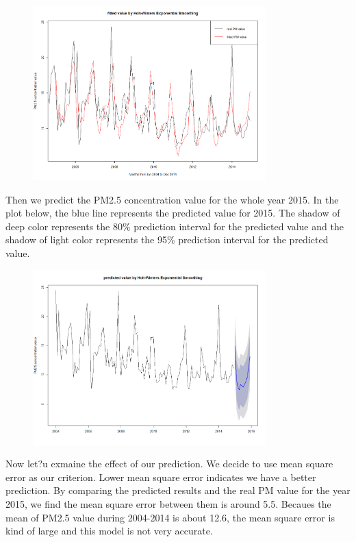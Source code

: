 \begin{figure}[ht!]
\centering
\includegraphics[width = 90mm]{ts2.png}
\end{figure}

Then we predict the PM2.5 concentration value for the whole year 2015. In the plot below, the blue line represents the predicted value for 2015. The shadow of deep color represents the 80\% prediction interval for the predicted value and the shadow of light color represents the 95\% prediction interval for the predicted value.

\begin{figure}[ht!]
\centering
\includegraphics[width = 90mm]{ts3.png}
\end{figure}

Now let?u exmaine the effect of our prediction. We decide to use mean square error as our criterion. Lower mean square error indicates we have a better prediction. By comparing the predicted results and the real PM value for the year 2015, we find the mean square error between them is around 5.5. Becaues the mean of PM2.5 value during 2004-2014 is about 12.6, the mean square error is kind of large and this model is not very accurate.

